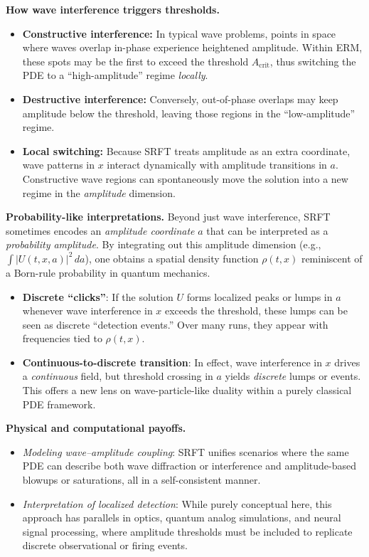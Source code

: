\documentclass[12pt]{article}
\begin{document}
\medskip

\noindent
\textbf{How wave interference triggers thresholds.}
\begin{itemize}
    \item \textbf{Constructive interference:}
    In typical wave problems, points in space where waves overlap in-phase experience
    heightened amplitude. Within ERM, these spots may be the first to exceed the
    threshold $A_{\mathrm{crit}}$, thus switching the PDE to a “high-amplitude”
    regime \emph{locally}.
    \item \textbf{Destructive interference:}
    Conversely, out-of-phase overlaps may keep amplitude below the threshold,
    leaving those regions in the “low-amplitude” regime. 
    \item \textbf{Local switching:}
    Because SRFT treats amplitude as an extra coordinate, wave patterns in $x$
    interact dynamically with amplitude transitions in $a$. Constructive wave
    regions can spontaneously move the solution into a new regime in the
    \emph{amplitude} dimension.
\end{itemize}

\medskip

\noindent
\textbf{Probability-like interpretations.}
Beyond just wave interference, SRFT sometimes encodes an \emph{amplitude coordinate} $a$
that can be interpreted as a \emph{probability amplitude}. By integrating out this
amplitude dimension (e.g., $\int |U(t,x,a)|^2 \, da$), one obtains a spatial density
function $\rho(t,x)$ reminiscent of a Born-rule probability in quantum mechanics.
\begin{itemize}
    \item \textbf{Discrete “clicks”}: 
    If the solution $U$ forms localized peaks or lumps in $a$ whenever wave
    interference in $x$ exceeds the threshold, these lumps can be seen as
    discrete “detection events.” Over many runs, they appear with frequencies
    tied to $\rho(t,x)$.
    \item \textbf{Continuous-to-discrete transition}: 
    In effect, wave interference in $x$ drives a \emph{continuous} field,
    but threshold crossing in $a$ yields \emph{discrete} lumps or events.
    This offers a new lens on wave-particle-like duality within a purely
    classical PDE framework.
\end{itemize}

\medskip

\noindent
\textbf{Physical and computational payoffs.}
\begin{itemize}
    \item \emph{Modeling wave–amplitude coupling}: 
    SRFT unifies scenarios where the same PDE can describe both wave diffraction
    or interference and amplitude-based blowups or saturations, all in a
    self-consistent manner.
    \item \emph{Interpretation of localized detection}:
    While purely conceptual here, this approach has parallels in optics, quantum
    analog simulations, and neural signal processing, where amplitude thresholds
    must be included to replicate discrete observational or firing events.
\end{itemize}
\end{document}

